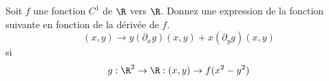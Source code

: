 
\begin{exercice}\label{exo0054}

Soit $f$ une fonction $C^1$ de $\R$ vers $\R$. Donnez une
expression de la fonction suivante en fonction de la dérivée de $f$.
\[
(x,y) \rightarrow y (\partial_x g)(x,y) + x (\partial_y g)(x,y)
\]
si
\[
g : \R^2 \rightarrow \R : (x,y) \rightarrow f(x^2-y^2)
\]

\end{exercice}
